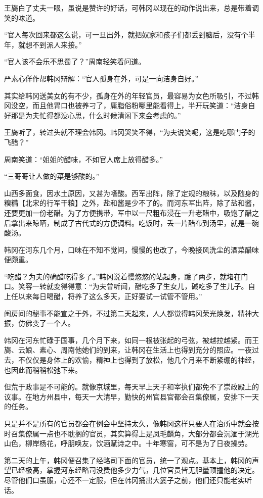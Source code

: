王旖白了丈夫一眼，虽说是赞许的好话，可韩冈以现在的动作说出来，总是带着调笑的味道。

“官人每次回来都这么说，可一旦出外，就把奴家和孩子们都丢到脑后，没有个半年，就想不到派人来接。”

“官人该不会乐不思蜀了？”周南轻笑着问道。

严素心佯作帮韩冈辩解：“官人孤身在外，可是一向洁身自好。”

其实给韩冈送美女的有不少，孤身在外的年轻官员，最容易为女色所吸引，不过韩冈没空，而且他胃口也被养刁了，庸脂俗粉哪里能看得上，半开玩笑道：“洁身自好那是为夫忙得都没心思，什么时候清闲下来会考虑的。”

王旖听了，转过头就不理会韩冈。韩冈哭笑不得，“为夫说笑呢，这是吃哪门子的飞醋？”

周南笑道：“姐姐的醋味，不如官人席上放得醋多。”

“三哥哥让人做的菜是够酸的。”

山西多面食，因水土原因，又甚为嗜酸。西军出阵，除了定规的粮秣，以及随身的糗糒【北宋的行军干粮】之外，盐和酱是少不了的。而河东军出阵，除了盐和酱，还要更加一份老醋。为了方便携带，军中以一尺粗布浸在一升老醋中，吸饱了醋之后拿出来晾晒，制成了古代式的方便调料。吃饭时，丢一片醋布到汤里，就是一碗酸汤。

韩冈在河东几个月，口味在不知不觉间，慢慢的也改了，今晚接风洗尘的酒菜醋味便颇重。

“吃醋？为夫的确醋吃得多了。”韩冈说着慢悠悠的站起身，踱了两步，就堵在门口。笑容一转就变得得意：“为夫曾听闻，醋吃多了生女儿，碱吃多了生儿子。自上任以来每日喝醋，将养了这么多天，正好要试一试管不管用。”

闺房间的秘事不能宣之于外，不过第二天起来，人人都觉得韩冈荣光焕发，精神大振，仿佛变了一个人。

韩冈在河东忙碌于国事，几个月下来，如同一根被张起的弓弦，被越拉越紧。而王旖、云娘、素心、周南他她们的到来，让韩冈在生活上也得到充分的照应。一夜过去，不仅仅是身体上的欢愉，精神上也得到了放松，他几个月来不断紧绷的神经，也因此而稍稍松弛下来。

但荒于政事是不可能的。就像京城里，每天早上天子和宰执们都免不了崇政殿上的议事。在地方州县中，每天一大清早，勤快的州官县官都会召集僚属，安排下一天的任务。

只是并不是所有的官员都会在例会中坚持太久，像韩冈这样只要人在治所中就会按时召集僚属一点也不耽搁的官员，其实算得上是凤毛麟角，大部分都会沉湎于湖光山色，柳岸杨花，呼朋唤友，饮酒赋诗之中。十年寒窗，可不是为了日夜操劳。

第二天的上午，韩冈便召集了经略司下面的官员，统一了观点。基本上，韩冈的声望已经极高，掌握河东经略司没费他多少力气，几位官员皆无胆量顶撞他的决定。尽管他们口虽服，心还不一定服，但在韩冈捅出大篓子之前，他们还只能老实听话。

